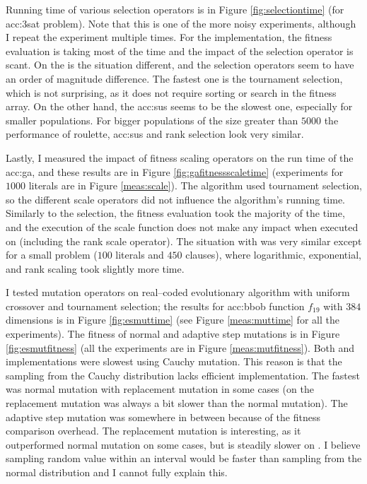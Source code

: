 Running time of various selection operators is in Figure \ref{fig:selectiontime} (for \acrshort{acc:3sat} problem). Note that this is one of the more noisy experiments, although I repeat the experiment multiple times. For the \cpu implementation, the fitness evaluation is taking most of the time and the impact of the selection operator is scant. On the \gpu is the situation different, and the selection operators seem to have an order of magnitude difference. The fastest one is the tournament selection, which is not surprising, as it does not require sorting or search in the fitness array. On the other hand, the \acrshort{acc:sus} seems to be the slowest one, especially for smaller populations. For bigger populations of the size greater than $5000$ the performance of roulette, \acrshort{acc:sus} and rank selection look very similar.

Lastly, I measured the impact of fitness scaling operators on the run time of the \acrshort{acc:ga}, and these results are in Figure \ref{fig:gafitnessscaletime} (experiments for $1000$ literals are in Figure \ref{meas:scale}). The algorithm used tournament selection, so the different scale operators did not influence the algorithm's running time. Similarly to the selection, the fitness evaluation took the majority of the time, and the execution of the scale function does not make any impact when executed on \cpu (including the rank scale operator). The situation with \gpu was very similar except for a small problem ($100$ literals and $450$ clauses), where logarithmic, exponential, and rank scaling took slightly more time.

I tested mutation operators on real--coded evolutionary algorithm with uniform crossover and tournament selection; the results for \acrshort{acc:bbob} function $f_{19}$ with $384$ dimensions is in Figure \ref{fig:esmuttime} (see Figure \ref{meas:muttime} for all the experiments). The fitness of normal and adaptive step mutations is in Figure \ref{fig:esmutfitness} (all the experiments are in Figure \ref{meas:mutfitness}). Both \cpu and \gpu implementations were slowest using Cauchy mutation. This reason is that the sampling from the Cauchy distribution lacks efficient implementation. The fastest was normal mutation with replacement mutation in some \gpu cases (on \cpu the replacement mutation was always a bit slower than the normal mutation). The adaptive step mutation was somewhere in between because of the fitness comparison overhead. The replacement mutation is interesting, as it outperformed normal mutation on some \gpu cases, but is steadily slower on \cpuns. I believe sampling random value within an interval would be faster than sampling from the normal distribution and I cannot fully explain this.

